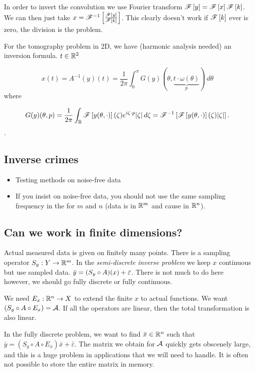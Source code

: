 \documentclass[12pt]{article}
\begin{document}
In order to invert the convolution we use Fourier transform $\mathscr{F}\left[y\right]=\mathscr{F}\left[x\right]\mathscr{F}\left[k\right]$. We can then just take $x = \mathscr{F}^{-1}\left[\frac{\mathscr{F}\left[y\right]}{\mathscr{F}\left[k\right]}\right]$. This clearly doesn't work if $\mathscr{F}\left[k\right]$ ever is zero, the division is the problem.

For the tomography problem in 2D, we have (harmonic analysis needed) an inversion formula. $t\in\mathbb{R}^2$

\begin{equation*}
    x(t) = A^{-1}(y)(t) = \frac{1}{2\pi}\int_0^\pi G(y)(\theta,\underbrace{t\cdot\omega(\theta)}_p) \, d\theta
\end{equation*}
where 

$$G(y)(\theta,p)= \frac{1}{2\pi}\int_{\mathbb{R}} \mathscr{F}\left[y(\theta,\cdot)\right](\zeta)e^{i\zeta \cdot p}|\zeta|\, d\zeta = \mathscr{F}^{-1}\left[\mathscr{F}\left[y(\theta,\cdot)\right](\zeta) |\zeta|\right].$$.

\subsection{Inverse crimes}
\begin{itemize}
    \item Testing methods on noise-free data
    \item If you insist on noise-free data, you should not use the same sampling frequency in the for $m$ and $n$ (data is in $\mathbb{R}^{m}$ and cause in $\mathbb{R}^n$).
\end{itemize}


\subsection{Can we work in finite dimensions?}
Actual measured data is given on finitely many points. There is a sampling operator $S_y:Y\to\mathbb{R}^m$. In the \textit{semi-discrete inverse problem} we keep $x$ continuous but use sampled data. $\bar{y} = (S_y\circ A)(x) + \bar{\varepsilon}$. There is not much to do here however, we should go fully discrete or fully continuous.

We need $E_x:\mathbb{R}^n\to X$ to extend the finite $x$ to actual functions. We want $(S_y\circ A \circ E_x)= \mathcal{A}$. If all the operators are linear, then the total transformation is also linear. 

In the fully discrete problem, we want to find $\bar{x}\in\mathbb{R}^n$ such that $\bar{y}=(S_y\circ A\circ E_x)\bar{x} + \bar{\varepsilon}$. The matrix we obtain for $\mathcal{A}$ quickly gets obscenely large, and this is a huge problem in applications that we will need to handle. It is often not possible to store the entire matrix in memory.
\end{document}
